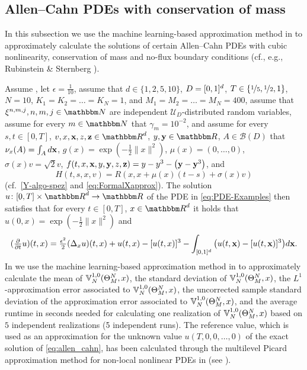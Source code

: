 \subsection{Allen--Cahn PDEs with conservation of mass}
\label{subsec:allen_cahn}
%
In this subsection we use the machine learning-based approximation method in 
to approximately calculate the solutions of certain Allen--Cahn PDEs with cubic nonlinearity, conservation of mass and no-flux boundary conditions (cf., e.g., Rubinstein \& Sternberg \cite{RUBINSTEIN1992}).

Assume , 
let
$\epsilon = \tfrac{1}{10}$,
assume that
$d\in\{1,2,5,10\}$,
$D = [0,1]^d$,
$T\in\{\nicefrac{1}{5},\nicefrac{1}{2},1\}$,
$N=10$,
$K_1 = K_2 = \ldots = K_N= 1$, and
$M_1 = M_2 = \ldots = M_N = 400$,
assume that 
$\xi^{n,m,j}, n, m, j \in \N$
are independent $\mathcal{U}_{D}$-distributed random variables,
assume for every 
$m \in \N$
that
$\gamma_m =10^{-2}$,
and
assume for every 
$s,t \in [0,T]$, 
$v,x,{\textbf x},z, {\textbf z} \in \R^d$, 
$y,{\textbf y} \in \R$,
$A \in \mathcal{B}(D)$
that
$\nu_x(A) = \int_A d{\textbf x}$,
$g(x)= \exp (-\tfrac{1}{2}\|x\|^2)$,
$\mu(x)=(0, \dots, 0)$,
$\sigma(x) v = \sqrt{2} v$, 
$f(t,x,{\textbf x},y,{\textbf y}, z, {\textbf z})=  y - y^3 - \left( {\textbf y} - {\textbf y}^3\right)$, and
\begin{equation}
	H(t,s,x,v) = R(x,x+\mu(x)(t-s)+\sigma(x)v)
\end{equation}
(cf.\ \eqref{Y-algo-spez} and \eqref{eq:FormalXapprox}).
The solution $u\colon[0,T]\times \R^d \to \R$ of the PDE in \eqref{eq:PDE-Examples} then satisfies that for every
$t\in [0,T]$, $x\in\R^d$ it holds that $u(0,x)=\exp (-\tfrac{1}{2}\|x\|^2)$ and
%
\begin{equation}
 (\tfrac{\partial}{\partial t}u)(t,x)
 =
 \tfrac{\epsilon^2}{2} (\Delta_x u)(t,x) + u(t,x) - [u(t,x)]^3 - \int_{[0,1]^d} \left(u(t,{\textbf x}) - [u(t,{\textbf x})]^3 \right) \!d{\textbf x} .
 \label{eq:allen_cahn}
\end{equation}
%
%
In 
we use the machine learning-based approximation method
in 
to approximately calculate
the mean of %
$
{\mathbb{V}}^{1,0}_N(\Theta^N_M,x)
$,
the standard deviation of %
$
{\mathbb{V}}^{1,0}_N(\Theta^N_M,x)
$,
the $ L^1 $-approximation error associated to %
$
{\mathbb{V}}^{1,0}_N(\Theta^N_M,x)
$,
the uncorrected sample standard deviation of the approximation error associated to %
$
{\mathbb{V}}^{1,0}_N(\Theta^N_M,x)
$,
and the average runtime in seconds needed for calculating one realization of $
{\mathbb{V}}^{1,0}_N(\Theta^N_M,x)
$
%
based on $5$ independent realizations (5 independent runs).
%
The reference value, which is used as an approximation for the unknown value $u(T,0,0,\ldots,0)$ of the exact solution of \eqref{eq:allen_cahn}, has been calculated through the multilevel Picard approximation method for non-local nonlinear PDEs in  (see ).


